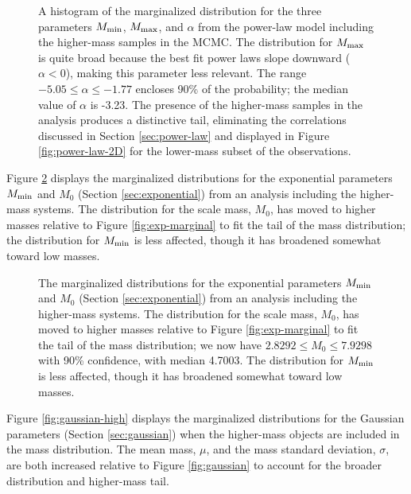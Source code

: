 \documentclass[preprint]{aastex}
\newcommand{\Mmin}{M_{\textnormal{min}}}
\newcommand{\Mmax}{M_{\textnormal{max}}}
\begin{document}
\begin{figure}
  \begin{center}
  \end{center}
  \caption{\label{fig:power-law-high} A histogram of the marginalized
    distribution for the three parameters $\Mmin$, $\Mmax$, and
    $\alpha$ from the power-law model including the higher-mass
    samples in the MCMC.  The distribution for $\Mmax$ is quite broad
    because the best fit power laws slope downward ($\alpha < 0$),
    making this parameter less relevant.  The range $-5.05 \leq \alpha
    \leq -1.77$ encloses 90\% of the probability; the median value of
    $\alpha$ is -3.23.  The presence of the higher-mass samples in the
    analysis produces a distinctive tail, eliminating the correlations
    discussed in Section \ref{sec:power-law} and displayed in Figure
    \ref{fig:power-law-2D} for the lower-mass subset of the
    observations. }
\end{figure}

Figure \ref{fig:exp-cutoff-high} displays the marginalized
distributions for the exponential parameters $\Mmin$ and $M_0$
(Section \ref{sec:exponential}) from an analysis including the
higher-mass systems.  The distribution for the scale mass, $M_0$, has
moved to higher masses relative to Figure \ref{fig:exp-marginal} to
fit the tail of the mass distribution; the distribution for $\Mmin$ is
less affected, though it has broadened somewhat toward low masses.

\begin{figure}
  \begin{center}
  \end{center}
  \caption{\label{fig:exp-cutoff-high} The marginalized distributions
    for the exponential parameters $\Mmin$ and $M_0$ (Section
    \ref{sec:exponential}) from an analysis including the higher-mass
    systems.  The distribution for the scale mass, $M_0$, has moved to
    higher masses relative to Figure \ref{fig:exp-marginal} to fit the
    tail of the mass distribution; we now have $2.8292 \leq M_0 \leq
    7.9298$ with 90\% confidence, with median 4.7003.  The
    distribution for $\Mmin$ is less affected, though it has broadened
    somewhat toward low masses.}
\end{figure}

Figure \ref{fig:gaussian-high} displays the marginalized distributions
for the Gaussian parameters (Section \ref{sec:gaussian}) when the
higher-mass objects are included in the mass distribution.  The mean
mass, $\mu$, and the mass standard deviation, $\sigma$, are both
increased relative to Figure \ref{fig:gaussian} to account for the
broader distribution and higher-mass tail.
\end{document}
